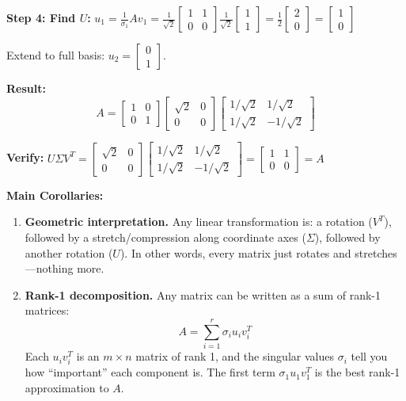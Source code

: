 \documentclass[11pt]{article}
\theoremstyle{definition}
\theoremstyle{plain}
\theoremstyle{remark}
\begin{document}
\begin{workedexample}[title=\textbf{Worked Example: SVD of a non-square matrix}]
\textbf{Step 4: Find $U$:} $u_1 = \frac{1}{\sigma_1}Av_1 = \frac{1}{\sqrt{2}}\begin{bmatrix}1&1\\0&0\end{bmatrix}\frac{1}{\sqrt{2}}\begin{bmatrix}1\\1\end{bmatrix} = \frac{1}{2}\begin{bmatrix}2\\0\end{bmatrix} = \begin{bmatrix}1\\0\end{bmatrix}$

Extend to full basis: $u_2 = \begin{bmatrix}0\\1\end{bmatrix}$.

\textbf{Result:}
\[
A = \begin{bmatrix}1&0\\0&1\end{bmatrix} \begin{bmatrix}\sqrt{2}&0\\0&0\end{bmatrix} \begin{bmatrix}1/\sqrt{2}&1/\sqrt{2}\\1/\sqrt{2}&-1/\sqrt{2}\end{bmatrix}
\]

\textbf{Verify:} $U\Sigma V^T = \begin{bmatrix}\sqrt{2} & 0\\0&0\end{bmatrix}\begin{bmatrix}1/\sqrt{2}&1/\sqrt{2}\\1/\sqrt{2}&-1/\sqrt{2}\end{bmatrix} = \begin{bmatrix}1&1\\0&0\end{bmatrix} = A$ \checkmark
\end{workedexample}

\bigskip
\textbf{Main Corollaries:}
\begin{enumerate}
  \item \textbf{Geometric interpretation.} Any linear transformation is: a rotation ($V^T$), followed by a stretch/compression along coordinate axes ($\Sigma$), followed by another rotation ($U$). In other words, every matrix just rotates and stretches---nothing more.

  \item \textbf{Rank-1 decomposition.} Any matrix can be written as a sum of rank-1 matrices:
  \[
  A = \sum_{i=1}^{r} \sigma_i u_i v_i^T
  \]
  Each $u_i v_i^T$ is an $m \times n$ matrix of rank 1, and the singular values $\sigma_i$ tell you how ``important'' each component is. The first term $\sigma_1 u_1 v_1^T$ is the best rank-1 approximation to $A$.
\end{enumerate}
\end{document}
